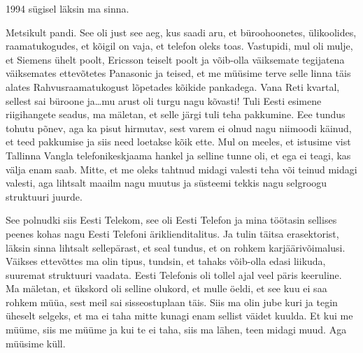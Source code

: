 1994 sügisel läksin ma sinna. 


Metsikult pandi. See oli just see aeg, kus saadi aru, et büroohoonetes, 
ülikoolides, raamatukogudes, et kõigil on vaja, et telefon oleks toas. 
Vastupidi, mul oli mulje, et Siemens ühelt poolt, Ericsson teiselt poolt ja 
võib-olla väiksemate tegijatena  väiksemates ettevõtetes Panasonic ja teised, 
et me müüsime terve selle linna täis alates Rahvusraamatukogust lõpetades 
kõikide pankadega. Vana Reti kvartal, sellest sai büroone ja\ldots mu arust oli 
turgu nagu kõvasti! Tuli Eesti esimene riigihangete seadus, ma mäletan, et 
selle järgi tuli teha pakkumine. Eee tundus tohutu põnev, aga ka pisut 
hirmutav, sest varem ei olnud  nagu niimoodi käinud, et teed pakkumise ja siis 
need loetakse kõik ette. Mul on meeles, et istusime vist Tallinna Vangla  
telefonikeskjaama hankel ja selline tunne oli, et ega ei teagi, kas välja enam 
saab. Mitte, et me oleks tahtnud midagi valesti teha või teinud midagi valesti, 
aga lihtsalt maailm nagu muutus ja süsteemi tekkis nagu selgroogu struktuuri 
juurde.


See polnudki siis Eesti Telekom, see oli Eesti Telefon ja 
mina töötasin sellises peenes kohas nagu Eesti Telefoni äriklienditalitus. Ja 
tulin täitsa erasektorist, läksin sinna lihtsalt sellepärast, et seal tundus, 
et on rohkem karjäärivõimalusi. Väikses ettevõttes ma olin tipus, tundsin, et 
tahaks võib-olla edasi liikuda, suuremat struktuuri vaadata. Eesti Telefonis 
oli tollel ajal veel päris keeruline. Ma mäletan, et ükskord oli selline 
olukord, et mulle öeldi, et see kuu ei saa rohkem müüa, sest meil sai 
sisseostuplaan täis. Siis ma olin jube kuri ja tegin üheselt selgeks, et ma ei 
taha mitte kunagi enam sellist väidet kuulda. Et kui me müüme, siis me müüme ja 
kui te ei taha, siis ma lähen, teen midagi muud. Aga müüsime küll.


